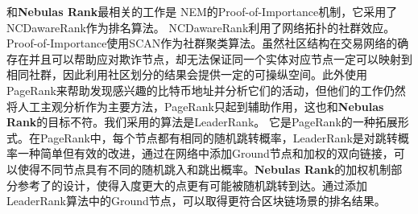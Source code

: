 和\textbf{Nebulas Rank}最相关的工作是 NEM\cite{nem}的Proof-of-Importance机制，它采用了 NCDawareRank\cite{Nikolakopoulos2013}作为排名算法。 NCDawareRank\cite{Nikolakopoulos2013}利用了网络拓扑的社群效应。Proof-of-Importance使用SCAN\cite{xu2007scan}\cite{shiokawa2015scan}\cite{chang2017mathsf}作为社群聚类算法。虽然社区结构在交易网络的确存在并且可以帮助应对欺诈节点，却无法保证同一个实体对应节点一定可以映射到相同社群，因此利用社区划分的结果会提供一定的可操纵空间。此外\textcite{Fleder2015}使用PageRank来帮助发现感兴趣的比特币地址并分析它们的活动，但他们的工作仍然将人工主观分析作为主要方法，PageRank只起到辅助作用，这也和\textbf{Nebulas Rank}的目标不符。我们采用的算法是LeaderRank\cite{Chen2013}\cite{Li2014}。 它是PageRank的一种拓展形式。在PageRank中，每个节点都有相同的随机跳转概率，LeaderRank是对跳转概率一种简单但有效的改进，通过在网络中添加Ground节点和加权的双向链接，可以使得不同节点具有不同的随机跳入和跳出概率。\textbf{Nebulas Rank}的加权机制部分参考了\textcite{Li2014}的设计，使得入度更大的点更有可能被随机跳转到达。通过添加LeaderRank算法中的Ground节点，可以取得更符合区块链场景的排名结果。

